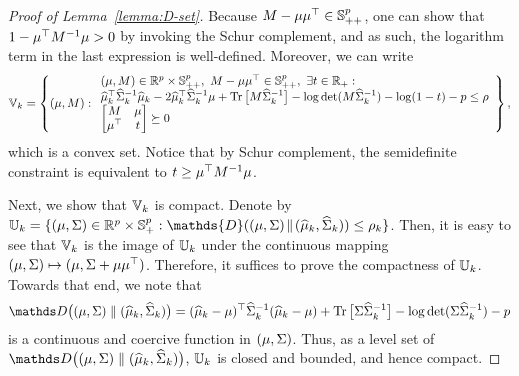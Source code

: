 \documentclass{article}
\begin{document}
\begin{proof}[Proof of Lemma~\ref{lemma:D-set}]
	Because $M - \mu\mu^\top \in \mathbb{S}_{++}^p$, one can show that $1 - \mu^\top M^{-1} \mu > 0$ by invoking the Schur complement, and as such, the logarithm term in the last expression is well-defined. Moreover, we can write 
	\begin{align}
	\mathbb V_k = \left\{(\mu, M) :
	\begin{array}{l}
	(\mu, M) \in \mathbb{R}^p \times \mathbb{S}_{++}^p,~M - \mu\mu^\top \in \mathbb{S}_{++}^p,~\exists t \in \mathbb{R}_+: \\
	\widehat {\mu}_k^\top \widehat{\Sigma}_k^{-1} \widehat {\mu}_k - 2 \widehat {\mu}_k^\top \widehat{\Sigma}_k^{-1} \mu+\operatorname{Tr} \big[ M\widehat{\Sigma}_k^{-1} \big] - \log\det (M\widehat{\Sigma}_k^{-1}) - \log(1- t) - p \leq \rho \\
	\begin{bmatrix} M & \mu \\ \mu^\top & t \end{bmatrix} \succeq 0	\end{array}
	\right\}, \label{eq:D-refor}
	\end{align}
	which is a convex set. Notice that by Schur complement, the semidefinite constraint is equivalent to $t \ge \mu^\top M^{-1} \mu$.
	
	Next, we show that $\mathbb V_k$ is compact. Denote by $\mbb U_k =  \{ (\m, \cov)\in \R^p\times \PSD^p:  \mathds{D}( (\m, \cov)\! \parallel\! (\msa_k, \covsa_k) )\le \rho_k \}$. Then, it is easy to see that $\mathbb V_k$ is the image of $\mathbb U_k$ under the continuous mapping $(\mu, \Sigma) \mapsto (\mu, \Sigma + \mu\mu^\top)$. Therefore, it suffices to prove the compactness of $\mathbb U_k$. Towards that end, we note that 
	\[ {\mathds D} \big( (\m, \cov) \parallel (\msa_k, \covsa_k) \big) =(\msa_k - \m)^\top\covsa_k^{-1} (\msa_k - \m) +  \Tr{\cov \covsa_k^{-1}} - \log\det (\cov \covsa_k^{-1}) - p  \]
	is a continuous and coercive function in $(\mu, \Sigma)$. Thus, as a level set of ${\mathds D} \big( (\m, \cov) \parallel (\msa_k, \covsa_k) \big)$, $\mathbb U_k$ is closed and bounded, and hence compact.
	

\end{proof}
\end{document}

